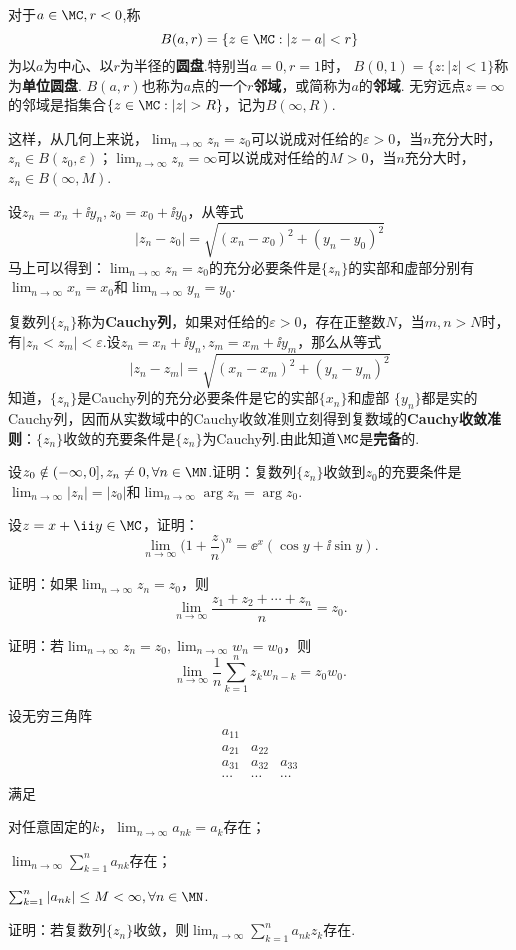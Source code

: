 对于$a\in\MC,r<0$,称
\[B(a,r)=\{z\in\MC:|z-a|<r\}\]
为以$a$为中心、以$r$为半径的\textbf{圆盘}.特别当$a=0,r=1$时， $B(0,1)=\{z:|z|<1\}$称为\textbf{单位圆盘}. $B(a,r)$也称为$a$点的一个\textbf{$r$邻域}，或简称为$a$的\textbf{邻域}. 无穷远点$z=\infty$的邻域是指集合$\{z\in\MC:|z|>R\}$，记为$B(\infty,R)$.

这样，从几何上来说，$\lim_{n\to\infty}z_n=z_0$可以说成对任给的$\varepsilon>0$，当$n$充分大时，$z_n\in B(z_0,\varepsilon)$；$\lim_{n\to\infty}z_n=\infty$可以说成对任给的$M>0$，当$n$充分大时，$z_n\in B(\infty,M)$.

设$z_n=x_n+\ii y_n,z_0=x_0+\ii y_0$，从等式
\[|z_n-z_0|=\sqrt{(x_n-x_0)^2+(y_n-y_0)^2}\]
马上可以得到：$\lim_{n\to\infty}z_n=z_0$的充分必要条件是$\{z_n\}$的实部和虚部分别有$\lim_{n\to\infty}x_n=x_0$和$\lim_{n\to\infty}y_n=y_0$.

复数列$\{z_n\}$称为\textbf{Cauchy列}，如果对任给的$\varepsilon>0$，存在正整数$N$，当$m,n>N$时，有$|z_n<z_m|<\varepsilon$.设$z_n=x_n+\ii y_n,z_m=x_m+\ii y_m$，那么从等式
\[|z_n-z_m|=\sqrt{(x_n-x_m)^2+(y_n-y_m)^2}\]
知道，$\{z_n\}$是Cauchy列的充分必要条件是它的实部$\{x_n\}$和虚部
$\{y_n\}$都是实的Cauchy列，因而从实数域中的Cauchy收敛准则立刻得到复数域的\textbf{Cauchy收敛准则}：$\{z_n\}$收敛的充要条件是$\{z_n\}$为Cauchy列.由此知道$\MC$是\textbf{完备}的.

\begin{xiti}
  \item 设$z_0\notin(-\infty,0],z_n\ne0,\forall n\in\MN$.证明：复数列$\{z_n\}$收敛到$z_0$的充要条件是$\lim_{n\to\infty}|z_n|=|z_0|$和$\lim_{n\to\infty}\arg z_n=\arg z_0$.
  \item 设$z=x+\ii y\in\MC$，证明：
     \[\lim_{n\to\infty}\bigg(1+\frac zn\bigg)^n=\ee^x(\cos y+\ii\sin y).\]
  \item 证明：如果$\lim_{n\to\infty}z_n=z_0$，则
     \[\lim_{n\to\infty}\frac{z_1+z_2+\cdots+z_n}n=z_0.\]
  \item 证明：若$\lim_{n\to\infty}z_n=z_0,\lim_{n\to\infty}w_n=w_0$，则
     \[\lim_{n\to\infty}\frac1n\sum_{k=1}^nz_kw_{n-k}=z_0w_0.\]
  \item 设无穷三角阵
     \[\begin{matrix}
       a_{11}&\\
       a_{21}&a_{22}\\
       a_{31}&a_{32}&a_{33}\\
       \cdots&\cdots&\cdots
     \end{matrix}\]
  满足
  \begin{enuma}
    \item 对任意固定的$k$，$\lim_{n\to\infty}a_{nk}=a_k$存在；
    \item $\lim_{n\to\infty}\sum_{k=1}^na_{nk}$存在；
    \item $\sum_{k=1}^n|a_{nk}|\le M<\infty,\forall n\in \MN$.
  \end{enuma}
  证明：若复数列$\{z_n\}$收敛，则$\lim_{n\to\infty}\sum_{k=1}^na_{nk}z_k$存在.
\end{xiti}

